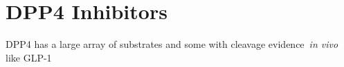\section{DPP4 Inhibitors}
DPP4 has a large array of substrates and some with cleavage evidence~\textit{in vivo} like GLP-1